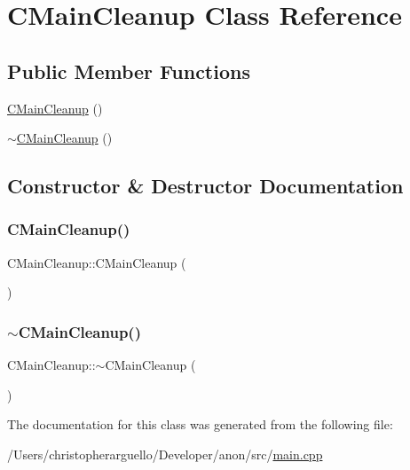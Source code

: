 \hypertarget{class_c_main_cleanup}{}\section{C\+Main\+Cleanup Class Reference}
\label{class_c_main_cleanup}
\subsection*{Public Member Functions}
\begin{DoxyCompactItemize}
\item 
\mbox{\hyperlink{class_c_main_cleanup_a2cc109dba5ab39dff1e8271a84577095}{C\+Main\+Cleanup}} ()
\item 
\mbox{\hyperlink{class_c_main_cleanup_a4459afc736eabd6e8c4aaa75f31e33f2}{$\sim$\+C\+Main\+Cleanup}} ()
\end{DoxyCompactItemize}


\subsection{Constructor \& Destructor Documentation}
\mbox{\label{class_c_main_cleanup_a2cc109dba5ab39dff1e8271a84577095}} 
\subsubsection{\texorpdfstring{C\+Main\+Cleanup()}{CMainCleanup()}}
{\footnotesize\ttfamily C\+Main\+Cleanup\+::\+C\+Main\+Cleanup (\begin{DoxyParamCaption}{ }\end{DoxyParamCaption})\hspace{0.3cm}{\ttfamily [inline]}}

\mbox{\label{class_c_main_cleanup_a4459afc736eabd6e8c4aaa75f31e33f2}} 
\subsubsection{\texorpdfstring{$\sim$\+C\+Main\+Cleanup()}{~CMainCleanup()}}
{\footnotesize\ttfamily C\+Main\+Cleanup\+::$\sim$\+C\+Main\+Cleanup (\begin{DoxyParamCaption}{ }\end{DoxyParamCaption})\hspace{0.3cm}{\ttfamily [inline]}}



The documentation for this class was generated from the following file\+:\begin{DoxyCompactItemize}
\item 
/\+Users/christopherarguello/\+Developer/anon/src/\mbox{\hyperlink{main_8cpp}{main.\+cpp}}\end{DoxyCompactItemize}
